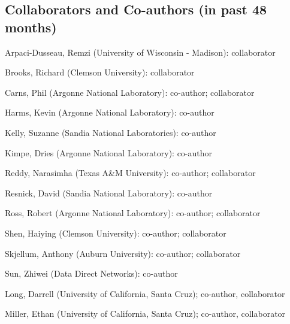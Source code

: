 \documentclass[11pt]{nsfcv}
\begin{document}
\subsection*{Collaborators and Co-authors (in past 48 months)}
\begin{itemtight}
\item Arpaci-Dusseau, Remzi  (University of Wisconsin - Madison): collaborator
\item Brooks, Richard (Clemson University): collaborator
\item Carns, Phil (Argonne National Laboratory): co-author; collaborator
\item Harms, Kevin (Argonne National Laboratory): co-author
\item Kelly, Suzanne (Sandia National Laboratories): co-author
\item Kimpe, Dries (Argonne National Laboratory): co-author
\item Reddy, Narasimha (Texas A\&M University): co-author; collaborator
\item Resnick, David (Sandia National Laboratory): co-author
\item Ross, Robert (Argonne National Laboratory): co-author; collaborator
\item Shen, Haiying (Clemson University): co-author; collaborator
\item Skjellum, Anthony (Auburn University): co-author; collaborator
\item Sun, Zhiwei (Data Direct Networks): co-author
\item Long, Darrell (University of California, Santa Cruz); co-author, collaborator
\item Miller, Ethan (University of California, Santa Cruz); co-author, collaborator
\end{itemtight}
\end{document}

